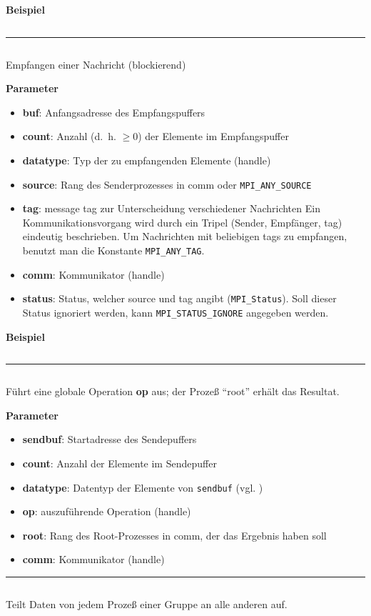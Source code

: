 \textbf{Beispiel}
\inputminted[numbersep=5pt, tabsize=4]{c}{scripts/mpi/mpi-send-example.c}
\goodbreak
\rule{\textwidth}{0.4pt}%
\inputminted[numbersep=5pt, tabsize=4]{c}{scripts/mpi/mpi-receive.c}
Empfangen einer Nachricht (blockierend) 

\textbf{Parameter}
\begin{itemize}
    \item \textbf{buf}: Anfangsadresse des Empfangspuffers
    \item \textbf{count}: Anzahl (d.~h. $\geq 0$) der Elemente im Empfangspuffer
    \item \textbf{datatype}: Typ der zu empfangenden Elemente (handle)
    \item \textbf{source}: Rang des Senderprozesses in comm oder \texttt{MPI\_ANY\_SOURCE}
    \item \textbf{tag}: message tag zur Unterscheidung verschiedener Nachrichten
                  Ein Kommunikationsvorgang wird durch ein Tripel (Sender, Empfänger, tag) eindeutig beschrieben. Um Nachrichten mit beliebigen tags zu empfangen, benutzt man die Konstante \texttt{MPI\_ANY\_TAG}.
    \item \textbf{comm}: Kommunikator (handle) 
    \item \textbf{status}: Status, welcher source und tag angibt (\texttt{MPI\_Status}).
          Soll dieser Status ignoriert werden, kann \texttt{MPI\_STATUS\_IGNORE} angegeben werden.
\end{itemize}

\textbf{Beispiel}
\inputminted[numbersep=5pt, tabsize=4]{c}{scripts/mpi/mpi-receive-example.c}
\goodbreak
\rule{\textwidth}{0.4pt}%
\inputminted[numbersep=5pt, tabsize=4]{c}{scripts/mpi/mpi-reduce.c}
Führt eine globale Operation \textbf{op} aus; der Prozeß \enquote{root} erhält das Resultat.

\textbf{Parameter}
\begin{itemize}
    \item \textbf{sendbuf}: Startadresse des Sendepuffers
    \item \textbf{count}: Anzahl der Elemente im Sendepuffer
    \item \textbf{datatype}: Datentyp der Elemente von \texttt{sendbuf} (vgl. )
    \item \textbf{op}: auszuführende Operation (handle)
    \item \textbf{root}: Rang des Root-Prozesses in comm, der das Ergebnis haben soll
    \item \textbf{comm}: Kommunikator (handle)
\end{itemize}
\goodbreak
\rule{\textwidth}{0.4pt}%
\inputminted[numbersep=5pt, tabsize=4]{c}{scripts/mpi/mpi-alltoall.c}
Teilt Daten von jedem Prozeß einer Gruppe an alle anderen auf.

